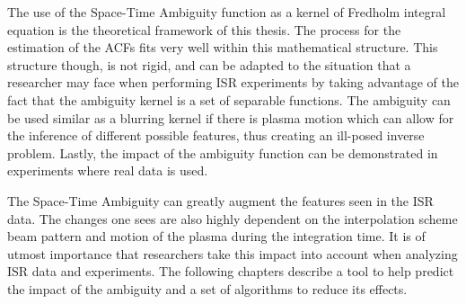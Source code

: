 The use of the Space-Time Ambiguity function as a kernel of Fredholm integral equation is the theoretical framework of this thesis. The process for the estimation of the ACFs fits very well within this mathematical structure. This structure though, is not rigid, and can be adapted to the situation that a researcher may face when performing ISR experiments by taking advantage of the fact that the ambiguity kernel is a set of separable functions. The ambiguity can be used similar as a blurring kernel if there is plasma motion which can allow for the inference of different possible features, thus creating an ill-posed inverse problem. Lastly, the impact of the ambiguity function can be demonstrated in experiments where real data is used.

The Space-Time Ambiguity can greatly augment the features seen in the ISR data. The changes one sees are also highly dependent on the interpolation scheme beam pattern and motion of the plasma during the integration time. It is of utmost importance that researchers take this impact into account when analyzing ISR data and experiments. The following chapters describe a tool to help predict the impact of the ambiguity and a set of algorithms to reduce its effects.